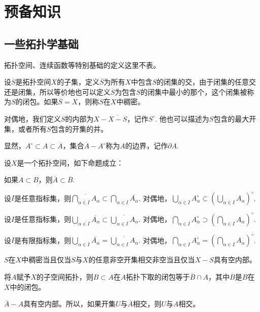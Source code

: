 \setcounter{chapter}{-1}
\chapter{预备知识}

\section{一些拓扑学基础}

拓扑空间、连续函数等特别基础的定义这里不表。

\begin{para}[闭包与内部]
设$S$是拓扑空间$X$的子集，定义$\overline{S}$为所有$X$中包含$S$的闭集的交，由于闭集的任意交还是闭集，所以等价地也可以定义$\overline{S}$为包含$S$的闭集中最小的那个，这个闭集被称为$S$的闭包。如果$\overline{S}=X$，则称$S$在$X$中稠密。

对偶地，我们定义$S$的内部为$X-\overline{X-S}$，记作$S^\circ$. 他也可以描述为$S$包含的最大开集，或者所有$S$包含的开集的并。

显然，$A^\circ \subset A \subset \overline{A}$，集合$\overline{A}-A^\circ$称为$A$的边界，记作$\partial A$.
\end{para}

\begin{pro}设$X$是一个拓扑空间，如下命题成立：
\begin{compactenum}[~~~(1)]
\item 如果$A\subset B$，则$\overline{A}\subset \overline{B}$.
\item 设$I$是任意指标集，则$\overline{\bigcap_{\alpha\in I} A_\alpha}\subset \bigcap_{\alpha\in I} \overline{A_\alpha}$. 对偶地，$\bigcup_{\alpha\in I} A_\alpha^\circ \subset \left(\bigcup_{\alpha\in I} A_\alpha\right)^\circ$.
\item 设$I$是任意指标集，则$\bigcup_{\alpha\in I} \overline{A_\alpha}\subset \overline{\bigcup_{\alpha\in I} A_\alpha}$. 对偶地，$\bigcap_{\alpha\in I} A_\alpha^\circ \supset \left(\bigcap_{\alpha\in I} A_\alpha\right)^\circ$.
\item 设$I$是有限指标集，则$\bigcup_{\alpha\in I} \overline{A_\alpha}= \overline{\bigcup_{\alpha\in I} A_\alpha}$. 对偶地，$\bigcap_{\alpha\in I} A_\alpha^\circ = \left(\bigcap_{\alpha\in I} A_\alpha\right)^\circ$.
\item $S$在$X$中稠密当且仅当$S$与$X$的任意非空开集相交非空当且仅当$X-S$具有空内部。
\item 将$A$赋予$X$的子空间拓扑，则$B\subset A$在$A$拓扑下取的闭包等于$\overline{B}\cap A$，其中$\overline{B}$是$B$在$X$中的闭包。
\item $\overline{A}-A$具有空内部。所以，如果开集$U$与$\overline{A}$相交，则$U$与$A$相交。
\end{compactenum}

\end{pro}

